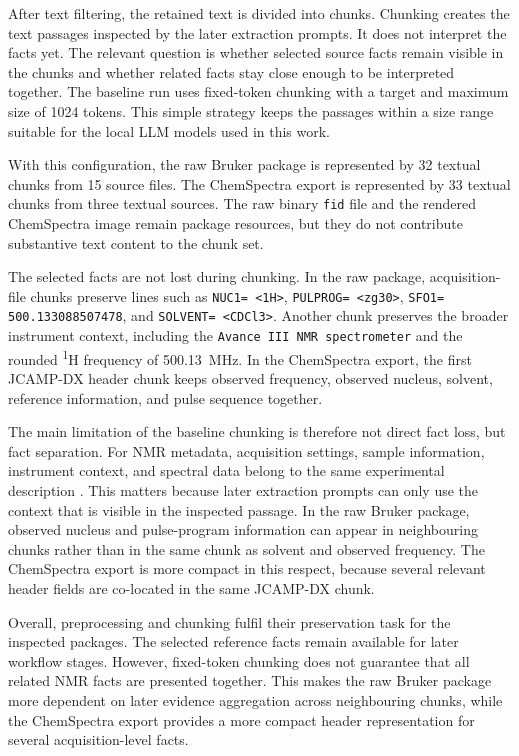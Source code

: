 After text filtering, the retained text is divided into chunks.
Chunking creates the text passages inspected by the later extraction prompts.
It does not interpret the facts yet.
The relevant question is whether selected source facts remain visible in the chunks and whether related facts stay close enough to be interpreted together.
The baseline run uses fixed-token chunking with a target and maximum size of 1024 tokens.
This simple strategy keeps the passages within a size range suitable for the local \ac{LLM} models used in this work.

With this configuration, the raw Bruker package is represented by 32 textual chunks from 15 source files.
The ChemSpectra export is represented by 33 textual chunks from three textual sources.
The raw binary \texttt{fid} file and the rendered ChemSpectra image remain package resources, but they do not contribute substantive text content to the chunk set.

The selected facts are not lost during chunking. 
In the raw package, acquisition-file chunks preserve lines such as \texttt{NUC1= <1H>}, \texttt{PULPROG= <zg30>}, \texttt{SFO1= 500.133088507478}, and \texttt{SOLVENT= <CDCl3>}.
Another chunk preserves the broader instrument context, including the \texttt{Avance III NMR spectrometer} and the rounded \textsuperscript{1}H frequency of 500.13~MHz.
In the ChemSpectra export, the first \ac{JCAMP-DX} header chunk keeps observed frequency, observed nucleus, solvent, reference information, and pulse sequence together.

The main limitation of the baseline chunking is therefore not direct fact loss, but fact separation.
For NMR metadata, acquisition settings, sample information, instrument context, and spectral data belong to the same experimental description \cite{Schober2018nmrML}.
This matters because later extraction prompts can only use the context that is visible in the inspected passage.
In the raw Bruker package, observed nucleus and pulse-program information can appear in neighbouring chunks rather than in the same chunk as solvent and observed frequency.
The ChemSpectra export is more compact in this respect, because several relevant header fields are co-located in the same \ac{JCAMP-DX} chunk.

Overall, preprocessing and chunking fulfil their preservation task for the inspected packages.
The selected reference facts remain available for later workflow stages.
However, fixed-token chunking does not guarantee that all related NMR facts are presented together.
This makes the raw Bruker package more dependent on later evidence aggregation across neighbouring chunks, while the ChemSpectra export provides a more compact header representation for several acquisition-level facts.

